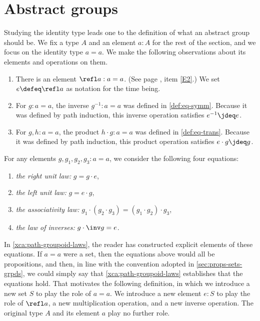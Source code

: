 \section{Abstract groups}
\label{sec:identity-type-as-abstract}

Studying the identity type leads one to the definition of what an abstract group should be.  We fix a type $A$ and an element $a:A$ for the rest
of the section, and we focus on the identity type $a=a$.  We make the following observations about its elements and operations on them.

\begin{enumerate}
\item
  There is an element $\refl a : a=a$.
  (See page \pageref{rules-for-equality}, item \ref{E2}.)
  We set $e \defeq \refl a$ as notation for the time being.
\item
  For $g : a=a$, the inverse $g^{-1} : a=a$ was defined in \cref{def:eq-symm}.
  Because it was defined by path induction, this inverse operation satisfies $e^{-1} \jdeq e$.
\item
  For $g, h : a=a$, the product $h \cdot g : a=a$ was defined in \cref{def:eq-trans}.
  Because it was defined by path induction, this product operation satisfies $e \cdot g \jdeq g$.
\end{enumerate}

For any elements $g,g_1,g_2,g_3:a=a$, we consider the following four equations:
\begin{enumerate}
\item
  \label{it:right-unit} \emph{the right unit law:} $g=g\cdot e$,
\item
  \label{it:left-unit} \emph{the left unit law:} $g=e\cdot g$,
\item
  \label{it:associativity} \emph{the associativity law:} $g_1\cdot(g_2\cdot g_3)=(g_1\cdot g_2)\cdot g_3$,
\item
  \label{it:inverse} \emph{the law of inverses:} $g\cdot \inv g = e$.
\end{enumerate}

In \cref{xca:path-groupoid-laws}, the reader has constructed explicit elements of these equations.  If $a=a$ were a set, then the equations
above would all be propositions, and then, in line with the convention adopted in \cref{sec:props-sets-grpds}, we could simply say that
\cref{xca:path-groupoid-laws} establishes that the equations hold.  That motivates the following definition, in which we introduce a new set $S$
to play the role of $a=a$.  We introduce a new element $e:S$ to play the role of $\refl a$, a new multiplication operation, and a new inverse
operation.  The original type $A$ and its element $a$ play no further role.

